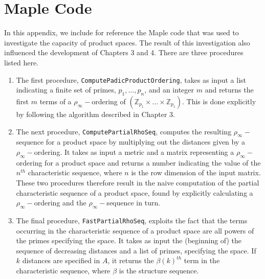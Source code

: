 \section*{Maple Code}

In this appendix, we include for reference the Maple code that was used to investigate the capacity of product spaces. The result of this investigation also influenced the development of Chapters 3 and 4. There are three procedures listed here.

\begin{enumerate}
	\item The first procedure, \texttt{ComputePadicProductOrdering}, takes as input a list indicating a finite set of primes, $p_1, 
\ldots, p_n$, and an integer $m$ and returns the first $m$ terms of a $\rho_\infty-$ordering of $(\mathbb{Z}_{p_1} \times \ldots \times \mathbb{Z}_{p_1} )$. This is done explicitly by following the algorithm described in Chapter 3.
	\item The next procedure, \texttt{ComputePartialRhoSeq}, computes the resulting $\rho_\infty-$sequence for a product space by multiplying out the distances given by a $\rho_\infty-$ordering. It takes as input a metric and a matrix representing a $\rho_\infty-$ordering for a product space and returns a number indicating the value of the $n^{th}$ characteristic sequence, where $n$ is the row dimension of the input matrix. These two procedures therefore result in the naive computation of the partial characteristic sequence of a product space, found by explicitly calculating a $\rho_\infty-$ordering and the $\rho_\infty-$sequence in turn.
	
	\item The final procedure, \texttt{FastPartialRhoSeq}, exploits the fact that the terms occurring in the characteristic sequence of a product space are all powers of the primes specifying the space. It takes as input the (beginning of) the sequence of decreasing distances and a list of primes, specifying the space. If $k$ distances are specified in $A$, it returns the $\beta(k)^{th}$ term in the characteristic sequence, where $\beta$ is the structure sequence.
\end{enumerate}

\newpage



\newpage


\newpage


